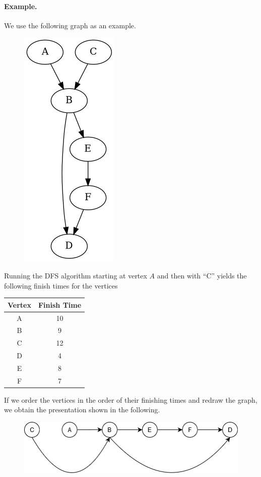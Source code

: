 \paragraph{Example.} 

We use the following graph as an example.

\begin{figure}[H]
\centering
\includegraphics[scale=0.4]{images/dfs_06.png}
\end{figure}

Running the DFS algorithm starting at vertex $A$ and then with ``C'' yields the following finish times for the vertices

\begin{tabular}{c|c}
  Vertex & Finish Time \\ \hline
  A & 10 \\
  B & 9 \\
  C & 12 \\
  D & 4 \\
  E & 8 \\
  F & 7
\end{tabular}

If we order the vertices in the order of their finishing times and redraw the graph, we obtain the presentation shown in the following.

\begin{figure}[H]
\centering
\includegraphics[scale=0.7]{images/dfs_07.png}
\end{figure}

